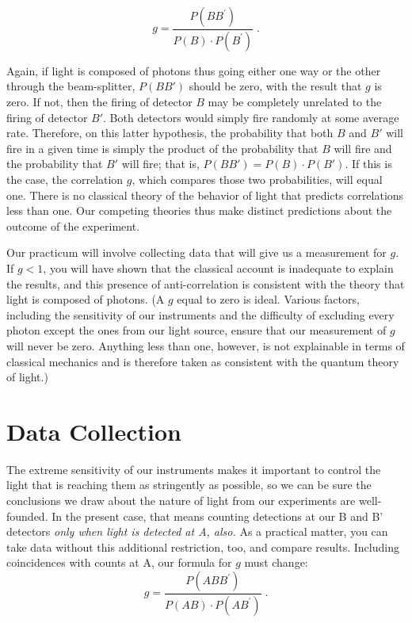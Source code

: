 \[g = \frac{P(BB^\prime)}{P(B) \cdot P(B^\prime)} \; . \]

Again, if light is composed of photons thus going either one way or the other through the beam-splitter, $P(BB')$ should be zero, with the result that $g$ is zero.  If not, then the firing of detector $B$ may be completely unrelated to the firing of detector $B'$.  Both detectors would simply fire randomly at some average rate.  Therefore, on this latter hypothesis, the probability that both $B$ and $B'$ will fire in a given time is simply the product of the probability that $B$ will fire and the probability that $B'$ will fire; that is, $P(BB') = P(B)\cdot P(B')$. If this is the case, the correlation $g$, which compares those two probabilities, will equal one.  There is no classical theory of the behavior of light that predicts correlations less than one. Our competing theories thus make distinct predictions about the outcome of the experiment.

Our practicum will involve collecting data that will give us a measurement for $g$.  If $g<1$, you will have shown that the classical account is inadequate to explain the results, and this presence of anti-correlation is consistent with the theory that light is composed of photons.  (A $g$ equal to zero is ideal.  Various factors, including the sensitivity of our instruments and the difficulty of excluding every photon except the ones from our light source, ensure that our measurement of $g$ will never be zero.  Anything less than one, however, is not explainable in terms of classical mechanics and is therefore taken as consistent with the quantum theory of light.)



\section*{Data Collection}

The extreme sensitivity of our instruments makes it important to control the light that is 
reaching them as stringently as possible, so we can be sure the conclusions we draw about the nature of light from our experiments are well-founded. In the present case, that means counting detections at our B and B' detectors \emph{only when light is detected at A, also.} As a practical matter, you can take data without this additional restriction, too, and compare results. Including coincidences with counts at A, our formula for $g$ must change:
\[g = \frac{P(ABB^\prime)}{P(AB) \cdot P(AB^\prime)} \; .\]


